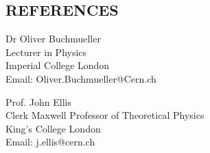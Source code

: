 \documentclass[9pt]{res} %
\begin{document}
\begin{resume}


\section{REFERENCES}
\vspace{0.2cm}
\begin{minipage}[t]{0.5\textwidth}
Dr Oliver Buchmueller\\
Lecturer in Physics\\
Imperial College London\\
Email: Oliver.Buchmueller@Cern.ch
\end{minipage}
\begin{minipage}[t]{0.5\textwidth}
Prof. John Ellis\\
Clerk Maxwell Professor of Theoretical Physics\\
King's College London\\
Email: j.ellis@cern.ch
\end{minipage}

\end{resume}
\end{document}
